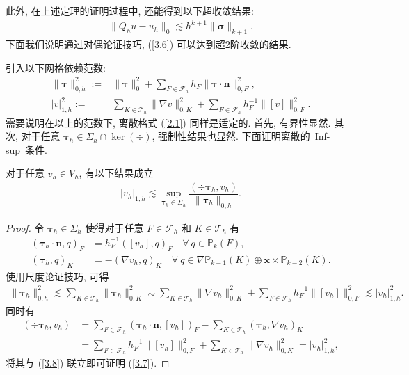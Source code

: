 	此外, 在上述定理的证明过程中, 还能得到以下超收敛结果:
	\begin{align}
		\label{3.6}\|Q_h u-u_h\|_0\lesssim h^{k+1}\|\boldsymbol\sigma\|_{k+1}.
	\end{align}
	下面我们说明通过对偶论证技巧, (\ref{3.6}) 可以达到超2阶收敛的结果.
	
	引入以下网格依赖范数:
	\begin{align*}
		\|\boldsymbol\tau\|^2_{0,h}:=&\|\boldsymbol\tau\|^2_0+\sum_{F\in\mathcal{F}_h}h_F\|\boldsymbol\tau\cdot\textbf{n}\|^2_{0,F},\\
		|v|^2_{1,h}:=&\sum_{K\in\mathcal{T}_h}\|\nabla v\|^2_{0,K}+\sum_{F\in\mathcal{F}_h}h_F^{-1}\|[v]\|^2_{0,F}.
	\end{align*}
	需要说明在以上的范数下, 离散格式 (\ref{2.1}) 同样是适定的. 首先, 有界性显然. 其次, 对于任意 $\boldsymbol\tau_h\in\Sigma_h\cap\ker(\div)$, 强制性结果也显然. 下面证明离散的~Inf-sup~条件.
	\begin{lemma}
		对于任意 $v_h\in V_h$, 有以下结果成立
		\begin{align}
			\label{3.7}
			|v_h|_{1,h}\lesssim\sup_{\boldsymbol\tau_h\in \Sigma_h}\dfrac{(\div\boldsymbol\tau_h, v_h)}{\|\boldsymbol\tau_h\|_{0,h}}.
		\end{align}
	\end{lemma}
	\begin{proof}
		令 $\boldsymbol\tau_h\in\Sigma_h$ 使得对于任意 $F\in\mathcal{F}_h$ 和 $K\in\mathcal{T}_h$ 有
		\begin{align*}
			(\boldsymbol\tau_h\cdot\textbf{n}, q)_F&=h_F^{-1}([v_h], q)_F \quad \forall \ q\in\mathbb{P}_k(F),\\
			(\boldsymbol\tau_h, q)_K&
			=-(\nabla v_h, q)_K \quad \forall \ q\in\nabla\mathbb{P}_{k-1}(K)\oplus\boldsymbol{x}\times\mathbb{P}_{k-2}(K).
		\end{align*}
		使用尺度论证技巧, 可得
		\begin{align}
			\label{3.8}
			\|\boldsymbol\tau_h\|^2_{0,h}\lesssim\sum_{K\in\mathcal{T}_h}\|\boldsymbol\tau_h\|^2_{0,K}\eqsim\sum_{K\in\mathcal{T}_h}\|\nabla v_h\|^2_{0,K}+\sum_{F\in\mathcal{F}_h}h_F^{-1}\|[v_h]\|^2_{0,F}\lesssim|v_h|^2_{1,h}.
		\end{align}
		同时有
		\begin{align*}
			(\div\boldsymbol\tau_h, v_h)&=\sum_{F\in\mathcal{F}_h}(\boldsymbol\tau_h\cdot\textbf{n}, [v_h])_F-\sum_{K\in\mathcal{T}_h}(\boldsymbol\tau_h, \nabla v_h)_K\\
			&=\sum_{F\in\mathcal{F}_h}h_F^{-1}\|[v_h]\|^2_{0,F}+\sum_{K\in\mathcal{T}_h}\|\nabla v_h\|^2_{0,K}=|v_h|^2_{1,h},
		\end{align*}
		将其与 (\ref{3.8}) 联立即可证明 (\ref{3.7}).
	\end{proof}
	
